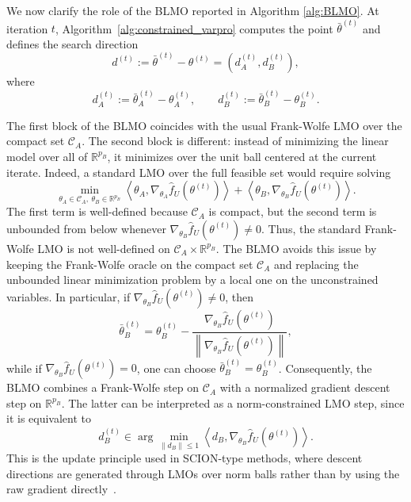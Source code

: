 \documentclass{article}
\begin{document}
    
We now clarify the role of the BLMO reported in Algorithm \ref{alg:BLMO}. At iteration \(t\), Algorithm~\ref{alg:constrained_varpro}
computes the point  $\bar\theta^{(t)}$
and defines the search direction
\[
    d^{(t)}
    :=
    \bar\theta^{(t)}-\theta^{(t)}
    =
    \left(
        d_A^{(t)},d_B^{(t)}
    \right),
\]
where
\[
    d_A^{(t)}
    :=
    \bar\theta_A^{(t)}-\theta_A^{(t)},
    \qquad
    d_B^{(t)}
    :=
    \bar\theta_B^{(t)}-\theta_B^{(t)}.
\]

The first block of the BLMO coincides with the usual Frank-Wolfe LMO
over the compact set \(\mathcal C_A\). The second block is different: instead of minimizing the linear
model over all of \(\mathbb{R}^{p_B}\), it minimizes over the unit ball centered at the current
iterate. Indeed, a standard LMO over the full feasible set would require solving
\[
    \min_{\theta_A\in \mathcal C_A,\ \theta_B\in\mathbb{R}^{p_B}}
    \left\langle
        \theta_A,
        \nabla_{\theta_A}\widehat f_U(\theta^{(t)})
    \right\rangle
    +
    \left\langle
        \theta_B,
        \nabla_{\theta_B}\widehat f_U(\theta^{(t)})
    \right\rangle .
\]
The first term is well-defined because \(\mathcal C_A\) is compact, but the second term is unbounded
from below whenever $\nabla_{\theta_B}\widehat f_U(\theta^{(t)})\neq 0$. 
Thus, the standard Frank-Wolfe LMO is not well-defined on
\(\mathcal C_A\times \mathbb{R}^{p_B}\). The BLMO avoids this issue by keeping the Frank-Wolfe
oracle on the compact set $\mathcal C_A$ and replacing the unbounded linear minimization
problem by a local one on the unconstrained variables. In particular, if
\(\nabla_{\theta_B}\widehat f_U(\theta^{(t)})\neq 0\), then
\[
    \bar\theta_B^{(t)}
    =
    \theta_B^{(t)}
    -
    \frac{
        \nabla_{\theta_B}\widehat f_U(\theta^{(t)})
    }{
        \left\|
        \nabla_{\theta_B}\widehat f_U(\theta^{(t)})
        \right\|
    },
\]
while if \(\nabla_{\theta_B}\widehat f_U(\theta^{(t)})=0\), one can choose
\(\bar\theta_B^{(t)}=\theta_B^{(t)}\). Consequently, the BLMO combines a Frank-Wolfe step on
\(\mathcal C_A\) with a normalized gradient descent step on \(\mathbb{R}^{p_B}\). The latter can be interpreted as
a norm-constrained LMO step, since it is equivalent to
\[
    d_B^{(t)}
    \in
    \arg\min_{\|d_B\|\le 1}
    \left\langle
        d_B,
        \nabla_{\theta_B}\widehat f_U(\theta^{(t)})
    \right\rangle .
\]
This is the update principle used in SCION-type methods, where descent directions are generated through LMOs over norm balls rather than by using the
raw gradient directly~\cite{pethick2025training}. 
\end{document}
